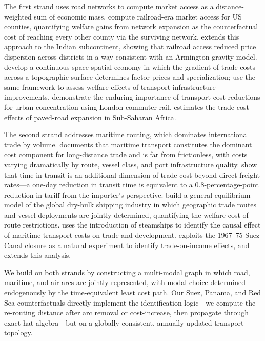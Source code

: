 \documentclass[11pt, a4paper]{article}
\begin{document}
The first strand uses road networks to compute market access as a
distance-weighted sum of economic mass.
\citet{donaldson_hornbeck_2016} compute railroad-era market access for US
counties, quantifying welfare gains from network expansion as the counterfactual
cost of reaching every other county via the surviving network.
\citet{donaldson_2018} extends this approach to the Indian subcontinent,
showing that railroad access reduced price dispersion across districts
in a way consistent with an Armington gravity model.
\citet{allen_arkolakis_2014} develop a continuous-space spatial economy in
which the gradient of trade costs across a topographic surface determines
factor prices and specialization; \citet{allen_arkolakis_2022} use the same
framework to assess welfare effects of transport infrastructure improvements.
\citet{heblich_redding_sturm_2020} demonstrate the enduring importance of
transport-cost reductions for urban concentration using London commuter rail.
\citet{storeygard_2016} estimates the trade-cost effects of paved-road expansion
in Sub-Saharan Africa.

The second strand addresses maritime routing, which dominates international
trade by volume.
\citet{hummels_2007} documents that maritime transport constitutes the dominant
cost component for long-distance trade and is far from frictionless, with costs
varying dramatically by route, vessel class, and port infrastructure quality.
\citet{hummels_schaur_2013} show that time-in-transit is an additional
dimension of trade cost beyond direct freight rates---a one-day reduction
in transit time is equivalent to a 0.8-percentage-point reduction in tariff
from the importer's perspective.
\citet{brancaccio_kalouptsidi_papageorgiou_2020} build a general-equilibrium
model of the global dry-bulk shipping industry in which geographic trade routes
and vessel deployments are jointly determined, quantifying the welfare cost
of route restrictions.
\citet{pascali_2017} uses the introduction of steamships to identify the
causal effect of maritime transport costs on trade and development.
\citet{feyrer_2009} exploits the 1967--75 Suez Canal closure as a natural
experiment to identify trade-on-income effects, and \citet{feyrer_2019}
extends this analysis.

We build on both strands by constructing a multi-modal graph in which
road, maritime, and air arcs are jointly represented, with modal choice
determined endogenously by the time-equivalent least cost path.
Our Suez, Panama, and Red Sea counterfactuals directly implement the
\citet{feyrer_2009} identification logic---we compute the re-routing distance
after arc removal or cost-increase, then propagate through exact-hat
algebra---but on a globally consistent, annually updated transport topology.
\end{document}
